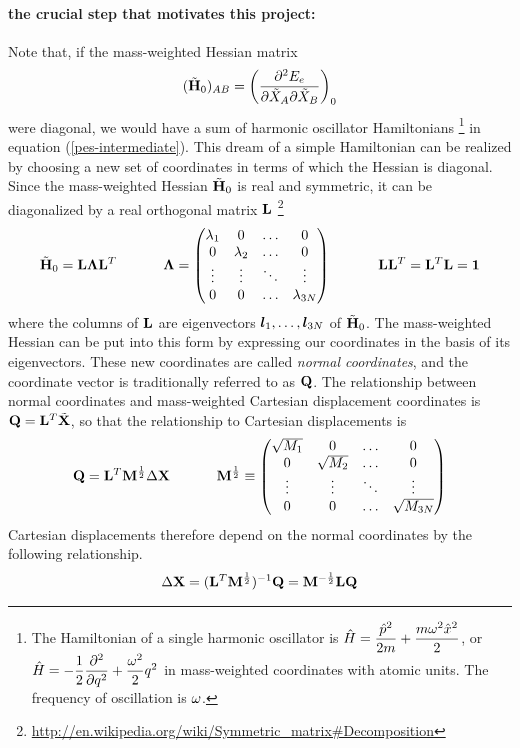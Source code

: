 \documentclass[11pt]{article}
\begin{document}
\paragraph{the crucial step that motivates this project:}
Note that, if the mass-weighted Hessian matrix
\begin{align}
	(\tilde{\mathbf{H}}_0)_{AB}
=
	\left(\dfrac{\partial^2 E_e}{\partial\tilde{X}_A\partial\tilde{X}_B}\right)_0
\end{align}
 were diagonal, we would have a sum of harmonic oscillator Hamiltonians \footnote{The Hamiltonian of a single harmonic oscillator is $\hat{H}=\dfrac{\hat{p}^2}{2m}+\dfrac{m\omega^2\hat{x}^2}{2}$, or $\hat{H}=-\dfrac{1}{2} \dfrac{ \partial^{2}  }{\partial q ^{2}}+\dfrac{\omega^2}{2}q^2$ in mass-weighted coordinates with atomic units.  The frequency of oscillation is $\omega$.} in equation (\ref{pes-intermediate}).
This dream of a simple Hamiltonian can be realized by choosing a new set of coordinates in terms of which the Hessian is diagonal.
Since the mass-weighted Hessian $\tilde{\mathbf{H}}_0$ is real and symmetric, it can be diagonalized by a real orthogonal matrix $\mathbf{L}$ \footnote{\url{http://en.wikipedia.org/wiki/Symmetric_matrix\#Decomposition}}
\begin{align}
	\tl{\bo{H}}_0
=
	\bo{L}\bm{\La}\bo{L}^T
\sp
%
	\bm{\La}
=
	\ma{\la_1&0&\ld&0\\
		0&\la_2&\ld&0\\
		\vd&\vd&\dd&\vd\\
		0&0&\ld&\la_{3N}}
\sp
%
	\bo{L}\bo{L}^T=\bo{L}^T\bo{L}=\bo{1}
\end{align}
where the columns of $\mathbf{L}$ are eigenvectors $\bm{l}_1,\ldots,\bm{l}_{3N}$ of $\tilde{\mathbf{H}}_0$.
The mass-weighted Hessian can be put into this form by expressing our coordinates in the basis of its eigenvectors.
These new coordinates are called {\it normal coordinates}, and the coordinate vector is traditionally referred to as $\mathbf{Q}$.
The relationship between normal coordinates and mass-weighted Cartesian displacement coordinates is $\mathbf{Q}=\mathbf{L}^T\tilde{\mathbf{X}}$, so that the relationship to Cartesian displacements is
\begin{align}
\label{q-to-dx}
%
	\bo{Q}
=
	\bo{L}^T
	\bo{M}^{\frac{1}{2}}
	\D\bo{X}
\sp
%
	\bo{M}^{\frac{1}{2}}
\equiv
	\ma{\sqrt{M_1}&0&\ld&0\\
		0&\sqrt{M_2}&\ld&0\\
		\vd&\vd&\dd&\vd\\
		0&0&\ld&\sqrt{M_{3N}}}
\end{align}
Cartesian displacements therefore depend on the normal coordinates by the following relationship.
\begin{align*}
%
	\D\bo{X}
=
	(\bo{L}^T\bo{M}^{\frac{1}{2}})^{-1}\bo{Q}
=
	\bo{M}^{-\frac{1}{2}}\bo{L}\bo{Q}
\end{align*}
\end{document}
